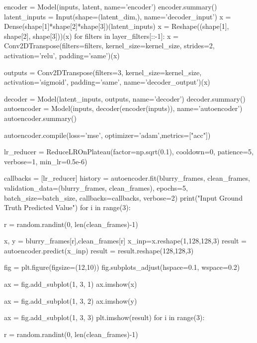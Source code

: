 encoder = Model(inputs, latent, name='encoder')
encoder.summary()
latent_inputs = Input(shape=(latent_dim,), name='decoder_input')
x = Dense(shape[1]*shape[2]*shape[3])(latent_inputs)
x = Reshape((shape[1], shape[2], shape[3]))(x)
for filters in layer_filters[::-1]:
    x = Conv2DTranspose(filters=filters,
                        kernel_size=kernel_size,
                        strides=2,
                        activation='relu',
                        padding='same')(x)

outputs = Conv2DTranspose(filters=3,
                          kernel_size=kernel_size,
                          activation='sigmoid',
                          padding='same',
                          name='decoder_output')(x)

decoder = Model(latent_inputs, outputs, name='decoder')
decoder.summary()
autoencoder = Model(inputs, decoder(encoder(inputs)), name='autoencoder')
autoencoder.summary()

autoencoder.compile(loss='mse', optimizer='adam',metrics=["acc"])

lr_reducer = ReduceLROnPlateau(factor=np.sqrt(0.1),
                               cooldown=0,
                               patience=5,
                               verbose=1,
                               min_lr=0.5e-6)

callbacks = [lr_reducer]
history = autoencoder.fit(blurry_frames,
                      clean_frames,
                      validation_data=(blurry_frames, clean_frames),
                      epochs=5,
                      batch_size=batch_size,
                      callbacks=callbacks,
                      verbose=2)
print("\n       Input                        Ground Truth                  Predicted Value")
for i in range(3):

    r = random.randint(0, len(clean_frames)-1)

    x, y = blurry_frames[r],clean_frames[r]
    x_inp=x.reshape(1,128,128,3)
    result = autoencoder.predict(x_inp)
    result = result.reshape(128,128,3)

    fig = plt.figure(figsize=(12,10))
    fig.subplots_adjust(hspace=0.1, wspace=0.2)

    ax = fig.add_subplot(1, 3, 1)
    ax.imshow(x)

    ax = fig.add_subplot(1, 3, 2)
    ax.imshow(y)

    ax = fig.add_subplot(1, 3, 3)
    plt.imshow(result)
for i in range(3):

    r = random.randint(0, len(clean_frames)-1)

